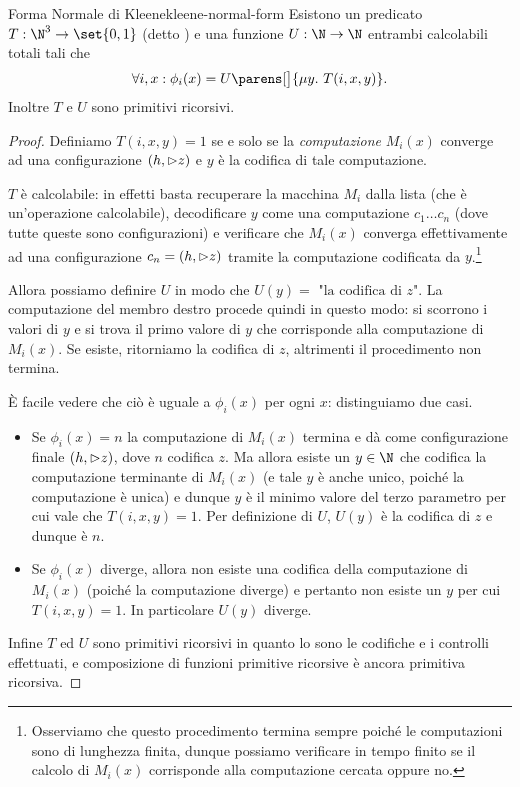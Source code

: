 \begin{theorem}
    {Forma Normale di Kleene}{kleene-normal-form}
    Esistono un predicato $T : \N^3 \to \set{0, 1}$ (detto ) e una funzione $U : \N \to \N$ entrambi calcolabili totali tali che \[
        \forall i, x: \phi_i(x) = U\parens[\big]{\mi{y}{T(i, x, y)}}.
    \] Inoltre $T$ e $U$ sono primitivi ricorsivi. 
\end{theorem}
\begin{proof}
    Definiamo $T(i, x, y) = 1$ se e solo se la \emph{computazione} $M_i(x)$ converge ad una configurazione $(h, {\vartriangleright} z)$ e $y$ è la codifica di tale computazione.
    
    $T$ è calcolabile: in effetti basta recuperare la macchina $M_i$ dalla lista (che è un'operazione calcolabile), decodificare $y$ come una computazione $c_1\dots c_n$ (dove tutte queste sono configurazioni) e verificare che $M_i(x)$ converga effettivamente ad una configurazione $c_n = (h, {\vartriangleright} z)$ tramite la computazione codificata da $y$.\footnote{Osserviamo che questo procedimento termina sempre poiché le computazioni sono di lunghezza finita, dunque possiamo verificare in tempo finito se il calcolo di $M_i(x)$ corrisponde alla computazione cercata oppure no.}
    
    Allora possiamo definire $U$ in modo che $U(y) = \text{ "la codifica di } z$". La computazione del membro destro procede quindi in questo modo: si scorrono i valori di $y$ e si trova il primo valore di $y$ che corrisponde alla computazione di $M_i(x)$. Se esiste, ritorniamo la codifica di $z$, altrimenti il procedimento non termina.
    
    È facile vedere che ciò è uguale a $\phi_i(x)$ per ogni $x$: distinguiamo due casi.
    \begin{itemize}
        \item Se $\phi_i(x) = n$ la computazione di $M_i(x)$ termina e dà come configurazione finale $(h, {\vartriangleright} z)$, dove $n$ codifica $z$. Ma allora esiste un $y \in \N$ che codifica la computazione terminante di $M_i(x)$ (e tale $y$ è anche unico, poiché la computazione è unica) e dunque $y$ è il minimo valore del terzo parametro per cui vale che $T(i, x, y) = 1$. Per definizione di $U$, $U(y)$ è la codifica di $z$ e dunque è $n$.
        \item Se $\phi_i(x)$ diverge, allora non esiste una codifica della computazione di $M_i(x)$ (poiché la computazione diverge) e pertanto non esiste un $y$ per cui $T(i, x, y) = 1$. In particolare $U(y)$ diverge.      
    \end{itemize}  

    Infine $T$ ed $U$ sono primitivi ricorsivi in quanto lo sono le codifiche e i controlli effettuati, e composizione di funzioni primitive ricorsive è ancora primitiva ricorsiva.
\end{proof}

